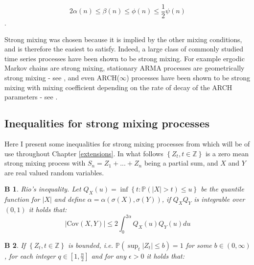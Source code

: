 \documentclass[11pt]{report}\usepackage[utf8]{inputenc}
\newtheorem{bound}{B}
\begin{document}
\begin{equation*}
    2\alpha(n) \leq \beta(n) \leq \phi(n) \leq \frac{1}{2}\psi(n)
\end{equation*}.

Strong mixing was chosen because it is implied by the other mixing conditions, and is therefore the easiest to satisfy. Indeed, a large class of commonly studied time series processes have been shown to be strong mixing. For example ergodic Markov chains are strong mixing, stationary ARMA processes are geometrically strong mixing - see \cite{mokkadem1988mixing}, and even ARCH($\infty$) processes have been shown to be strong mixing with mixing coefficient depending on the rate of decay of the ARCH parameters - see \cite{fryzlewicz2011mixing}.  

\subsection{Inequalities for strong mixing processes} \label{exponential inequalities}

Here I present some inequalities for strong mixing processes from \cite{bosq2012nonparametric} which will be of use throughout Chapter \ref{extensions}. In what follows $\left \{ Z_t, t \in \mathbb{Z} \right \}$ is a zero mean strong mixing process with $S_n = Z_1 + ... +Z_n$ being a partial sum, and $X$ and $Y$ are real valued random variables. 

\begin{bound} \label{B1}
    Rio's inequality. Let $Q_X(u) = \inf \left \{ t : \mathbb{P}\left ( \left | X \right | > t \right ) \leq u \right \}$ be the quantile function for $\left | X \right |$ and define $\alpha = \alpha \left ( \sigma (X), \sigma (Y) \right )$, if $Q_XQ_Y$ is integrable over $(0,1)$ it holds that: 
\begin{equation*}
    \left | \text{Cov}\left ( X,Y \right )  \right | \leq  2\int_{0}^{2 \alpha} Q_X(u)Q_Y(u)du
\end{equation*}    
    
\end{bound}

\begin{bound} \label{B2}
    If $\left \{ Z_t, t \in \mathbb{Z} \right \}$ is bounded, i.e. $\mathbb{P}\left ( \sup_t \left | Z_t \right | \leq b \right ) = 1$ for some $b \in (0, \infty)$, for each integer $q \in \left [ 1,\frac{n}{2} \right ]$ and for any $\epsilon > 0$ it holds that:
\end{bound} 
\end{document}
